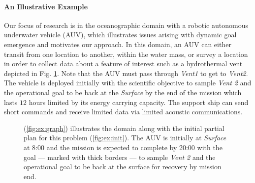 \paragraph{An Illustrative Example} 

Our focus of research is in the oceanographic domain with a robotic
autonomous underwater vehicle (AUV), which illustrates issues arising with
dynamic goal emergence and motivates our approach.  In this domain, an
AUV can either transit from one location to another, within the water
mass, or survey a location in order to collect data about a feature of
interest such as a hydrothermal vent depicted in
Fig. \ref{fig:Example}.  Note that the AUV must pass through {\em
  Vent1} to get to {\em Vent2}.  The vehicle is deployed initially
with the scientific objective to sample {\em Vent 2} and the
operational goal to be back at the {\em Surface} by the end of the
mission which lasts $12$ hours limited by its energy carrying
capacity. The support ship can send short commands and receive limited
data via limited acoustic communications.

\begin{figure}[!t]
  \centering
  \hfill {}
  \caption{\small{(\ref{fig:ex:graph}) illustrates the domain along
      with the initial partial plan for this problem
      (\ref{fig:ex:init}). The AUV is initially at {\em Surface} at
      8:00 and the mission is expected to complete by 20:00 with the
      goal --- marked with thick borders --- to sample {\em Vent 2}
      and the operational goal to be back at the surface for recovery
      by mission end.}}
  \label{fig:Example}
  \vskip-2mm
\end{figure}

